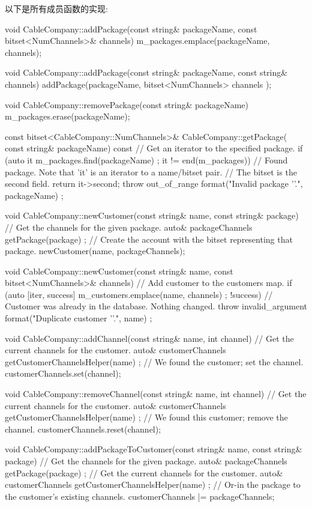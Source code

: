 以下是所有成员函数的实现:

\begin{cpp}
void CableCompany::addPackage(const string& packageName,
    const bitset<NumChannels>& channels)
{
    m_packages.emplace(packageName, channels);
}

void CableCompany::addPackage(const string& packageName, const string& channels)
{
    addPackage(packageName, bitset<NumChannels> { channels });
}

void CableCompany::removePackage(const string& packageName)
{
    m_packages.erase(packageName);
}

const bitset<CableCompany::NumChannels>& CableCompany::getPackage(
    const string& packageName) const
{
    // Get an iterator to the specified package.
    if (auto it { m_packages.find(packageName) }; it != end(m_packages)) {
        // Found package. Note that 'it' is an iterator to a name/bitset pair.
        // The bitset is the second field.
        return it->second;
    }
    throw out_of_range { format("Invalid package '{}'.", packageName) };
}

void CableCompany::newCustomer(const string& name, const string& package)
{
    // Get the channels for the given package.
    auto& packageChannels { getPackage(package) };
    // Create the account with the bitset representing that package.
    newCustomer(name, packageChannels);
}

void CableCompany::newCustomer(const string& name,
    const bitset<NumChannels>& channels)
{
    // Add customer to the customers map.
    if (auto [iter, success] { m_customers.emplace(name, channels) }; !success) {
        // Customer was already in the database. Nothing changed.
        throw invalid_argument { format("Duplicate customer '{}'.", name) };
    }
}

void CableCompany::addChannel(const string& name, int channel)
{
    // Get the current channels for the customer.
    auto& customerChannels { getCustomerChannelsHelper(name) };
    // We found the customer; set the channel.
    customerChannels.set(channel);
}

void CableCompany::removeChannel(const string& name, int channel)
{
    // Get the current channels for the customer.
    auto& customerChannels { getCustomerChannelsHelper(name) };
    // We found this customer; remove the channel.
    customerChannels.reset(channel);
}

void CableCompany::addPackageToCustomer(const string& name, const string& package)
{
    // Get the channels for the given package.
    auto& packageChannels { getPackage(package) };
    // Get the current channels for the customer.
    auto& customerChannels { getCustomerChannelsHelper(name) };
    // Or-in the package to the customer's existing channels.
    customerChannels |= packageChannels;
}


\end{cpp}
